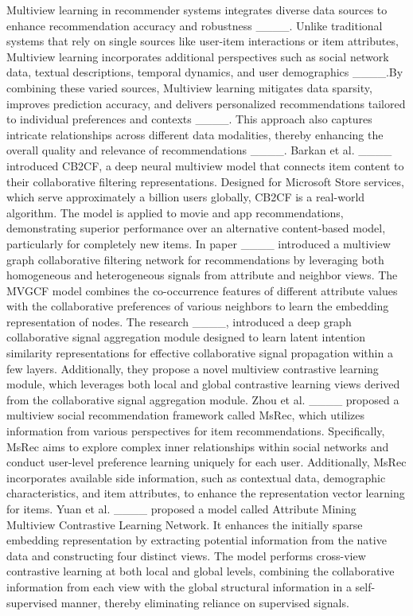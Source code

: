     Multiview learning in recommender systems integrates diverse data sources to enhance recommendation accuracy and robustness ____. Unlike traditional systems that rely on single sources like user-item interactions or item attributes,  Multiview learning incorporates additional perspectives such as social network data, textual descriptions, temporal dynamics, and user demographics  ____.By combining these varied sources,  Multiview learning mitigates data sparsity, improves prediction accuracy, and delivers personalized recommendations tailored to individual preferences and contexts ____. This approach also captures intricate relationships across different data modalities, thereby enhancing the overall quality and relevance of recommendations  ____. Barkan et al. ____ introduced CB2CF, a deep neural multiview model that connects item content to their collaborative filtering  representations. Designed for Microsoft Store services, which serve approximately a billion users globally, CB2CF is a real-world algorithm. The model is applied to movie and app recommendations, demonstrating superior performance over an alternative content-based model, particularly for completely new items. In paper ____ introduced a multiview graph collaborative filtering network for recommendations by leveraging both homogeneous and heterogeneous signals from attribute and neighbor views. The MVGCF model combines the co-occurrence features of different attribute values with the collaborative preferences of various neighbors to learn the embedding representation of nodes. The research ____, introduced a deep graph collaborative signal aggregation module designed to learn latent intention similarity representations for effective collaborative signal propagation within a few layers. Additionally, they propose a novel multiview contrastive learning module, which leverages both local and global contrastive learning views derived from the collaborative signal aggregation module.  Zhou et al. ____ proposed a multiview social recommendation framework called MsRec, which utilizes information from various perspectives for item recommendations. Specifically, MsRec aims to explore complex inner relationships within social networks and conduct user-level preference learning uniquely for each user. Additionally, MsRec incorporates available side information, such as contextual data, demographic characteristics, and item attributes, to enhance the representation vector learning for items. Yuan et al. ____ proposed a model called Attribute Mining Multiview Contrastive Learning Network. It enhances the initially sparse embedding representation by extracting potential information from the native data and constructing four distinct views. The model performs cross-view contrastive learning at both local and global levels, combining the collaborative information from each view with the global structural information in a self-supervised manner, thereby eliminating reliance on supervised signals.
    
